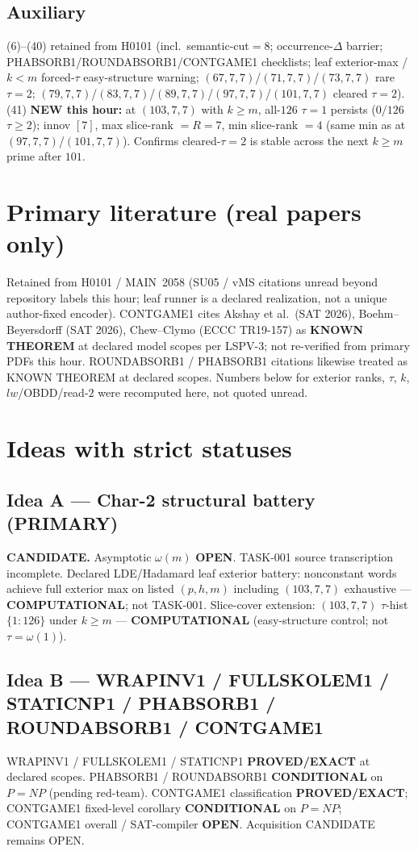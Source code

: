 \documentclass[11pt]{article}
\begin{document}
\subsection*{Auxiliary}
(6)--(40) retained from H0101 (incl.\ semantic-cut$=8$; occurrence-$\Delta$ barrier;
PHABSORB1/ROUNDABSORB1/CONTGAME1 checklists; leaf exterior-max / $k{<}m$ forced-$\tau$ easy-structure warning;
$(67,7,7)$/$(71,7,7)$/$(73,7,7)$ rare $\tau{=}2$; $(79,7,7)$/$(83,7,7)$/$(89,7,7)$/$(97,7,7)$/$(101,7,7)$ cleared $\tau{=}2$).
(41) \textbf{NEW this hour:} at $(103,7,7)$ with $k{\ge}m$, all-$126$ $\tau{=}1$ persists
($0/126$ $\tau{\ge}2$); innov $[7]$, max slice-rank $=R{=}7$, min slice-rank $=4$
(same min as at $(97,7,7)$/$(101,7,7)$). Confirms cleared-$\tau{=}2$
is stable across the next $k{\ge}m$ prime after $101$.

\section*{Primary literature (real papers only)}
Retained from H0101 / MAIN~2058 (SU05 / vMS citations unread beyond repository labels this hour;
leaf runner is a declared realization, not a unique author-fixed encoder).
CONTGAME1 cites Akshay et al.\ (SAT 2026), Boehm--Beyersdorff (SAT 2026),
Chew--Clymo (ECCC TR19-157) as \textbf{KNOWN THEOREM} at declared model scopes per LSPV-3;
not re-verified from primary PDFs this hour.
ROUNDABSORB1 / PHABSORB1 citations likewise treated as KNOWN THEOREM at declared scopes.
Numbers below for exterior ranks, $\tau$, $k$, $lw$/OBDD/read-$2$
were recomputed here, not quoted unread.

\section*{Ideas with strict statuses}
\subsection*{Idea A --- Char-2 structural battery (PRIMARY)}
\textbf{CANDIDATE.} Asymptotic $\omega(m)$ \textbf{OPEN}. TASK-001 source transcription incomplete.
Declared LDE/Hadamard leaf exterior battery: nonconstant words achieve full exterior max on
listed $(p,h,m)$ including $(103,7,7)$ exhaustive --- \textbf{COMPUTATIONAL}; not TASK-001.
Slice-cover extension: $(103,7,7)$ $\tau$-hist $\{1{:}126\}$ under $k{\ge}m$ ---
\textbf{COMPUTATIONAL} (easy-structure control; not $\tau=\omega(1)$).

\subsection*{Idea B --- WRAPINV1 / FULLSKOLEM1 / STATICNP1 / PHABSORB1 / ROUNDABSORB1 / CONTGAME1}
WRAPINV1 / FULLSKOLEM1 / STATICNP1 \textbf{PROVED/EXACT} at declared scopes.
PHABSORB1 / ROUNDABSORB1 \textbf{CONDITIONAL} on $P=NP$ (pending red-team).
CONTGAME1 classification \textbf{PROVED/EXACT}; CONTGAME1 fixed-level corollary
\textbf{CONDITIONAL} on $P=NP$; CONTGAME1 overall / SAT-compiler \textbf{OPEN}.
Acquisition CANDIDATE remains OPEN.
\end{document}
